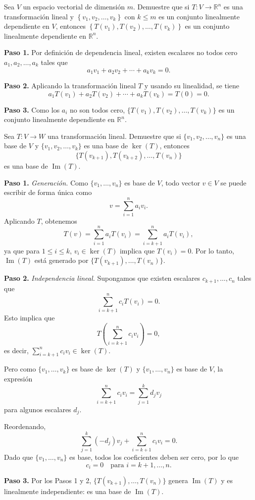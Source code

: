 \begin{prob}
Sea $V$ un espacio vectorial de dimensión $m$. Demuestre que si $T:V\rightarrow \mathbb{R}^n$ es una transformación lineal y $\left\lbrace v_1,v_2,\dots , v_k \right\rbrace$ con $k\leq m$ es un conjunto linealmente dependiente en $V$, entonces $\left\lbrace T(v_1), T(v_2), \dots , T(v_k)  \right\rbrace$ es un conjunto linealmente dependiente en $\mathbb{R}^n$.
\begin{myproof}
\textbf{Paso 1.} Por definición de dependencia lineal, existen escalares no todos cero $a_1, a_2, \dots, a_k$ tales que
\[
    a_1 v_1 + a_2 v_2 + \cdots + a_k v_k = 0.
\]

\textbf{Paso 2.} Aplicando la transformación lineal $T$ y usando su linealidad, se tiene
\[
    a_1 T(v_1) + a_2 T(v_2) + \cdots + a_k T(v_k) = T(0) = 0.
\]

\textbf{Paso 3.} Como los $a_i$ no son todos cero, $\{T(v_1), T(v_2), \dots, T(v_k)\}$ es un conjunto linealmente dependiente en $\mathbb{R}^n$.
\end{myproof}
\end{prob}

\begin{prob}
Sea $T: V \rightarrow W$ una transformación lineal. Demuestre que si $\{v_1, v_2, \dots, v_n\}$ es una base de $V$ y $\{v_1, v_2, \dots, v_k\}$ es una base de $\ker(T)$, entonces 
\[
\{T(v_{k+1}), T(v_{k+2}), \dots, T(v_n)\}
\]
es una base de $\operatorname{Im}(T)$.
\begin{myproof}
\textbf{Paso 1.} \emph{Generación.} Como $\{v_1, \dots, v_n\}$ es base de $V$, todo vector $v \in V$ se puede escribir de forma única como
\[
v = \sum_{i=1}^n a_i v_i.
\]
Aplicando $T$, obtenemos
\[
T(v) = \sum_{i=1}^n a_i T(v_i) = \sum_{i=k+1}^n a_i T(v_i),
\]
ya que para $1 \leq i \leq k$, $v_i \in \ker(T)$ implica que $T(v_i) = 0$. Por lo tanto, $\operatorname{Im}(T)$ está generado por $\{T(v_{k+1}), \dots, T(v_n)\}$.

\textbf{Paso 2.} \emph{Independencia lineal.} Supongamos que existen escalares $c_{k+1}, \dots, c_n$ tales que
\[
\sum_{i=k+1}^n c_i T(v_i) = 0.
\]
Esto implica que
\[
T\left(\sum_{i=k+1}^n c_i v_i\right) = 0,
\]
es decir, $\sum_{i=k+1}^n c_i v_i \in \ker(T)$.

Pero como $\{v_1, \dots, v_k\}$ es base de $\ker(T)$ y $\{v_1, \dots, v_n\}$ es base de $V$, la expresión
\[
\sum_{i=k+1}^n c_i v_i = \sum_{j=1}^k d_j v_j
\]
para algunos escalares $d_j$.

Reordenando,
\[
\sum_{j=1}^k (-d_j) v_j + \sum_{i=k+1}^n c_i v_i = 0.
\]
Dado que $\{v_1, \dots, v_n\}$ es base, todos los coeficientes deben ser cero, por lo que
\[
c_i = 0 \quad \text{para } i = k+1, \dots, n.
\]

\textbf{Paso 3.} Por los Pasos 1 y 2, $\{T(v_{k+1}), \dots, T(v_n)\}$ genera $\operatorname{Im}(T)$ y es linealmente independiente: es una base de $\operatorname{Im}(T)$.
\end{myproof}
\end{prob}

